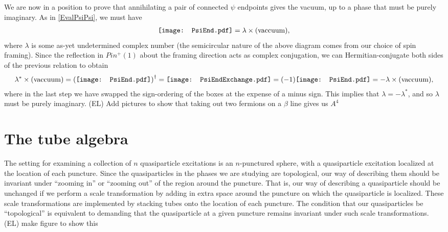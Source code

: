 \documentclass[12pt,a4paper]{article}
\newcommand{\ethan}[1]{{\color{amethyst}\footnotesize{(EL) #1}}}
\newcommand{\PsiEnd}{\mathord{\vcenter{\hbox{\texttt{[image: PsiEnd.pdf]}}}}}
\newcommand{\PsiEndExchange}{\mathord{\vcenter{\hbox{\texttt{[image: PsiEndExchange.pdf]}}}}}
\begin{document}
We are now in a position to prove that annihilating a pair of connected $\psi$ endpoints gives the vacuum, up to a phase that must be purely imaginary. As in \eqref{EvalPsiPsi}, we must have 
\begin{align}
\PsiEnd  = \lambda \times \text{(vaccuum)},
\end{align}
where $\lambda$ is some as-yet undetermined complex number (the semicircular nature of the above diagram comes from our choice of spin framing). Since the reflection in $Pin^+(1)$ about the framing direction acts as complex conjugation, we can Hermitian-conjugate both sides of the previous relation to obtain
\begin{align}
\lambda^{*} \times ({\rm vaccuum}) = \left( \PsiEnd \right) ^{\dagger}  = \PsiEndExchange = (-1) \PsiEnd  = - \lambda \times ({\rm vaccuum}),
\label{phase}
\end{align}
where in the last step we have swapped the sign-ordering of the boxes at the expense of a minus sign. 
This implies that $\lambda = - \lambda^*$, and so $\lambda$ must be purely imaginary. \ethan{Add pictures to show that taking out two fermions on a $\beta$ line gives us $A^4$}



\section{The tube algebra} \label{tube_alg}


The setting for examining a collection of $n$ quasiparticle excitations is an $n$-punctured sphere, with a quasiparticle excitation localized at the location of each puncture. 
Since the quasiparticles in the phases we are studying are topological, our way of describing them should be invariant under ``zooming in'' or ``zooming out'' of the region around the puncture. That is, our way of describing a quasiparticle should be unchanged if we perform a scale transformation by adding in extra space around the puncture on which the quasiparticle is localized. These scale transformations are implemented by stacking tubes onto the location of each puncture. The condition that our quasiparticles be ``topological'' is equivalent to demanding that the quasiparticle at a given puncture remains invariant under such scale transformations. \ethan{make figure to show this}
\end{document}
